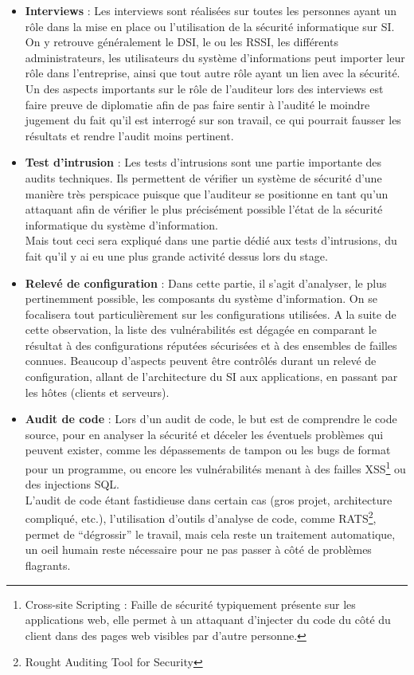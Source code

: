 \documentclass[a4paper]{memoir}
\begin{document}
\begin{itemize}

\item \textbf{Interviews} : Les interviews sont réalisées sur toutes les personnes ayant un rôle dans la mise en place ou l'utilisation de la sécurité informatique sur SI.
On y retrouve généralement le DSI, le ou les RSSI, les différents administrateurs, les utilisateurs du système d'informations peut importer leur rôle dans l'entreprise, ainsi que tout autre rôle ayant un lien avec la sécurité.\\
Un des aspects importants sur le rôle de l'auditeur lors des interviews est faire preuve de diplomatie afin de pas faire sentir à l'audité le moindre jugement du fait qu'il est interrogé sur son travail, ce qui pourrait fausser les résultats et rendre l'audit moins pertinent.\\

\item \textbf{Test d'intrusion} : Les tests d'intrusions sont une partie importante des audits techniques. Ils permettent de vérifier un système de sécurité d'une manière très perspicace puisque que l'auditeur se positionne en tant qu'un attaquant afin de vérifier le plus précisément possible l'état de la sécurité informatique du système d'information.\\
  Mais tout ceci sera expliqué dans une partie dédié aux tests d'intrusions, du fait qu'il y ai eu une plus grande activité dessus lors du stage.\\

\item \textbf{Relevé de configuration} : Dans cette partie, il s'agit d'analyser, le plus pertinemment possible, les composants du système d'information. On se focalisera tout particulièrement sur les configurations utilisées. A la suite de cette observation, la liste des vulnérabilités est dégagée en comparant le résultat à des configurations réputées sécurisées et à des ensembles de failles connues. Beaucoup d'aspects peuvent être contrôlés durant un relevé de configuration, allant de l'architecture du SI aux applications, en passant par les hôtes (clients et serveurs).\\

\item \textbf{Audit de code} : Lors d'un audit de code, le but est de comprendre le code source, pour en analyser la sécurité et déceler les éventuels problèmes qui peuvent exister, comme les dépassements de tampon ou les bugs de format pour un programme, ou encore les vulnérabilités menant à des failles XSS\footnote{Cross-site Scripting : Faille de sécurité typiquement présente sur les applications web, elle permet à un attaquant d'injecter du code du côté du client dans des pages web visibles par d'autre personne.} ou des injections SQL.\\
  \noindent L'audit de code étant fastidieuse dans certain cas (gros projet, architecture compliqué, etc.), l'utilisation d'outils d'analyse de code, comme RATS\footnote{Rought Auditing Tool for Security}, permet de ``dégrossir'' le travail, mais cela reste un traitement automatique, un oeil humain reste nécessaire pour ne pas passer à côté de problèmes flagrants.\\


\end{itemize}
\end{document}
